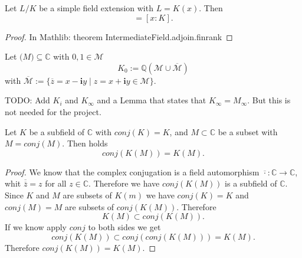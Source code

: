 \begin{theorem}
\label{thm:degree_of_simple_field_extension}
    Let $L/K$ be a simple field extension with $L = K(x)$. Then
    \begin{equation*}
        [L:K] = [x:K].
    \end{equation*}
\end{theorem}
\begin{proof}
    In Mathlib: theorem IntermediateField.adjoin.finrank
\end{proof}

\begin{definition}
    \label{def:K_M_0}
    Let $\mathcal(M)\subseteq\mathbb{C}$ with $0,1 \in \mathcal{M}$
    \begin{equation*}
        K_0 := \mathbb{Q}(\mathcal{M}\cup \overline{\mathcal{M}})
    \end{equation*}
    with $\overline{\mathcal{M}} := \{ \overline{z} = x - \textbf{i}y \mid z = x+\textbf{i}y  \in \mathcal{M} \}$.
\end{definition}

TODO: Add $K_i$ and $K_{\infty}$ and a Lemma that states that $K_{\infty} = M_{\infty}$. But this is not needed for the project.

\begin{lemma}
    \label{lem:conj_of_adjoin}
    Let $K$ be a subfield of $\mathbb{C}$ with $conj(K)=K$, and $ M \subset \mathbb{C}$ be a subset with $M = conj(M)$. Then holds
    \begin{equation*}
        conj(K(M)) = K(M).
    \end{equation*}
\end{lemma}
\begin{proof}
    We know that the complex conjugation is a field automorphism $\overline{\cdot }: \mathbb{C} \to \mathbb{C}$, whit $\overline{\overline{z}} = z$ for all $z \in \mathbb{C}$. Therefore we have
    $conj(K(M))$ is a subfield of $\mathbb{C}$.\\
    Since $K$ and $M$ are subsets of $K(m)$ we have $conj(K) = K$ and $conj(M) = M$ are subsets of $conj(K(M))$. Therefore $$K(M) \subset conj(K(M)).$$
    If we know apply $conj$ to both sides we get
    $$conj(K(M)) \subset conj(conj(K(M))) = K(M).$$
    Therefore $conj(K(M)) = K(M)$.
\end{proof}

